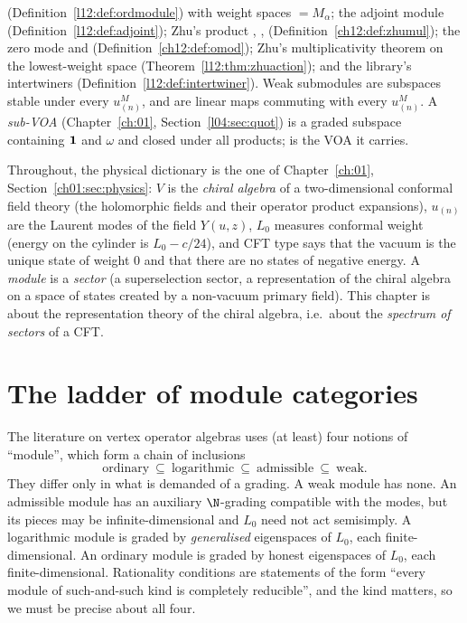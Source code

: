 (Definition~\ref{l12:def:ordmodule}) with weight spaces  $=M_\alpha$; the adjoint
module (Definition~\ref{l12:def:adjoint}); Zhu's product , , 
(Definition~\ref{ch12:def:zhumul}); the zero mode  and 
(Definition~\ref{ch12:def:omod}); Zhu's multiplicativity theorem on the lowest-weight space
(Theorem~\ref{l12:thm:zhuaction}); and the library's intertwiners
(Definition~\ref{l12:def:intertwiner}). Weak submodules  are subspaces
stable under every $u^M_{(n)}$, and  are linear maps commuting with every
$u^M_{(n)}$. A \emph{sub-VOA}  (Chapter~\ref{ch:01},
Section~\ref{l04:sec:quot}) is a graded subspace containing $\mathbf{1}$ and $\omega$ and closed
under all products;  is the VOA it carries.

\begin{physics}
Throughout, the physical dictionary is the one of Chapter~\ref{ch:01}, Section~\ref{ch01:sec:physics}: $V$ is the
\emph{chiral algebra} of a two-dimensional conformal field theory (the holomorphic fields and their operator
product expansions), $u_{(n)}$ are the Laurent modes of the field $Y(u,z)$, $L_0$ measures conformal weight
(energy on the cylinder is $L_0-c/24$), and CFT type says that the vacuum is the unique state of weight $0$ and
that there are no states of negative energy. A \emph{module} is a \emph{sector} (a superselection sector, a
representation of the chiral algebra on a space of states created by a non-vacuum primary field). This chapter
is about the representation theory of the chiral algebra, i.e.\ about the \emph{spectrum of sectors} of a CFT.
\end{physics}

\section{The ladder of module categories}\label{l12:sec:categories}

The literature on vertex operator algebras uses (at least) four notions of ``module'', which form
a chain of inclusions
\begin{equation*}
 \text{ordinary}\ \subseteq\ \text{logarithmic}\ \subseteq\ \text{admissible}\ \subseteq\ \text{weak}.
\end{equation*}
They differ only in what is demanded of a grading. A weak module has none. An admissible module has
an auxiliary $\N$-grading compatible with the modes, but its pieces may be infinite-dimensional and
$L_0$ need not act semisimply. A logarithmic module is graded by \emph{generalised} eigenspaces of
$L_0$, each finite-dimensional. An ordinary module is graded by honest eigenspaces of $L_0$, each
finite-dimensional. Rationality conditions are statements of the form ``every module of such-and-such
kind is completely reducible'', and the kind matters, so we must be precise about all four.

